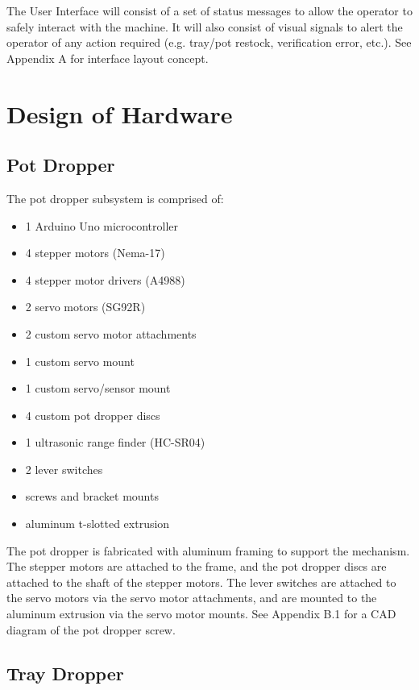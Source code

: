 \documentclass[12pt, titlepage]{article}
\begin{document}
The User Interface will consist of a set of status messages to allow the operator to safely 
interact with the machine. It will also consist of visual signals to alert
the operator of any action required (e.g. tray/pot restock, verification error, etc.).
See Appendix A for interface layout concept.

\section{Design of Hardware}

\subsection{Pot Dropper}

The pot dropper subsystem is comprised of:
\begin{itemize}
  \item 1 Arduino Uno microcontroller
  \item 4 stepper motors (Nema-17)
  \item 4 stepper motor drivers (A4988)
  \item 2 servo motors (SG92R)
  \item 2 custom servo motor attachments
  \item 1 custom servo mount
  \item 1 custom servo/sensor mount
  \item 4 custom pot dropper discs
  \item 1 ultrasonic range finder (HC-SR04)
  \item 2 lever switches
  \item screws and bracket mounts
  \item aluminum t-slotted extrusion
\end{itemize}
The pot dropper is fabricated with aluminum framing to support the mechanism. The stepper
 motors are attached to the frame, and the pot dropper discs are attached to the shaft 
of the stepper motors. The lever switches are attached to the servo motors via the servo motor attachments, and are 
mounted to the aluminum extrusion via the servo motor mounts. See Appendix B.1 for a CAD diagram of the pot dropper screw.

\subsection{Tray Dropper}
\end{document}
